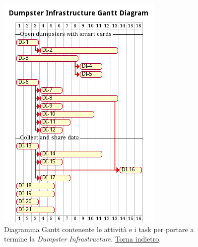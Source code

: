 \begin{figure}[H]
    \centering
    \includegraphics[width=\textwidth]{img/gantt-dumpster-infrastructure.pm}
    \caption{Diagramma Gantt contenente le attività e i task per portare a termine la \textit{Dumpster Infrastructure}. \hyperlink{back:gantt-dumpster-infrastructure}{Torna indietro}.}
    \label{fig:gantt-dumpster-infrastructure}
\end{figure}


